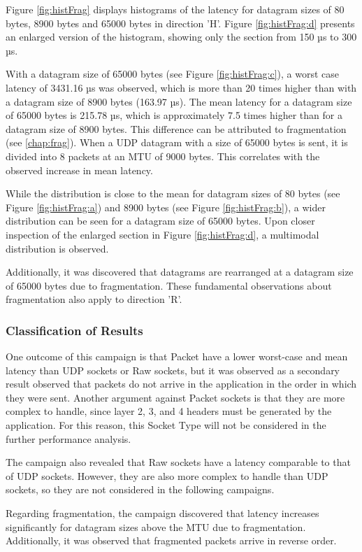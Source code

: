 Figure \ref{fig:histFrag} displays histograms of the latency for datagram sizes of 80 bytes, 8900 bytes and 65000 bytes in direction 'H'. Figure \ref{fig:histFrag:d} presents an enlarged version of the histogram, showing only the section from 150 µs to 300 µs.

With a datagram size of 65000 bytes (see Figure \ref{fig:histFrag:c}), a worst case latency of 3431.16 µs was observed, which is more than 20 times higher than with a datagram size of 8900 bytes (163.97 µs). The mean latency for a datagram size of 65000 bytes is 215.78 µs, which is approximately 7.5 times higher than for a datagram size of 8900 bytes. This difference can be attributed to fragmentation (see \ref{chap:frag}). When a UDP datagram with a size of 65000 bytes is sent, it is divided into 8 packets at an MTU of 9000 bytes. This correlates with the observed increase in mean latency.

While the distribution is close to the mean for datagram sizes of 80 bytes (see Figure \ref{fig:histFrag:a}) and 8900 bytes (see Figure \ref{fig:histFrag:b}), a wider distribution can be seen for a datagram size of 65000 bytes. Upon closer inspection of the enlarged section in Figure \ref{fig:histFrag:d}, a multimodal distribution is observed.

Additionally, it was discovered that datagrams are rearranged at a datagram size of 65000 bytes due to fragmentation.  These fundamental observations about fragmentation also apply to direction 'R'.

\subsubsection{Classification of Results}
One outcome of this campaign is that Packet have a lower worst-case and mean latency than UDP sockets or Raw sockets, but it was observed as a secondary result observed that packets do not arrive in the application in the order in which they were sent. Another argument against Packet sockets is that they are more complex to handle, since layer 2, 3, and 4 headers must be generated by the application. For this reason, this Socket Type will not be considered in the further performance analysis.

The campaign also revealed that Raw sockets have a latency comparable to that of UDP sockets. However, they are also more complex to handle than UDP sockets, so they are not considered in the following campaigns.

Regarding fragmentation, the campaign discovered that latency increases significantly for datagram sizes above the MTU due to fragmentation. Additionally, it was observed that fragmented packets arrive in reverse order.


